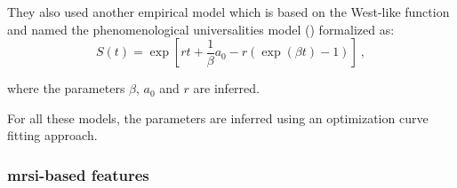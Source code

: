 \begin{enumerate}[leftmargin=*]
They also used another empirical model which is based on the West-like function and named the phenomenological universalities model (\cite{Castorina2006}) formalized as:
\begin{equation}
	S(t) = \exp \left[ r t + \frac{1}{\beta} a_0 - r \left( \exp( \beta t ) - 1 \right) \right] \ ,
	\label{eq:pun}
\end{equation}

\noindent where the parameters $\beta$, $a_0$ and $r$ are inferred.

For all these models, the parameters are inferred using an optimization curve fitting approach.

\end{enumerate}

\subsubsection{\ac{mrsi}-based features}

